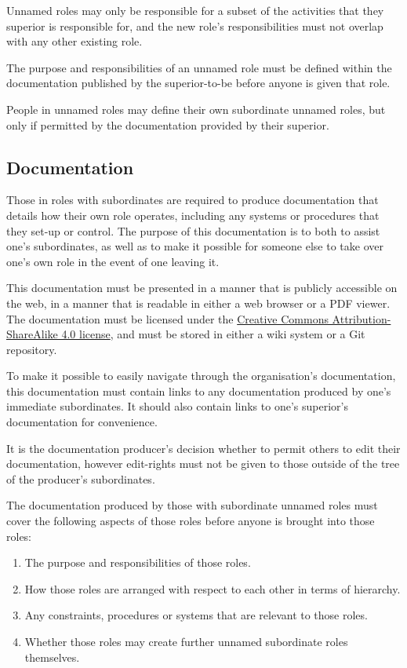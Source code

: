 Unnamed roles may only be responsible for a subset of the activities that they superior is responsible for, and the new role's responsibilities must not overlap with any other existing role.

The purpose and responsibilities of an unnamed role must be defined within the documentation published by the superior-to-be before anyone is given that role.

People in unnamed roles may define their own subordinate unnamed roles, but only if permitted by the documentation provided by their superior.

\subsection{Documentation}
\label{sec:documentation}

Those in roles with subordinates are required to produce documentation that details how their own role operates, including any systems or procedures that they set-up or control.  The purpose of this documentation is to both to assist one's subordinates, as well as to make it possible for someone else to take over one's own role in the event of one leaving it.

This documentation must be presented in a manner that is publicly accessible on the web, in a manner that is readable in either a web browser or a PDF viewer.  The documentation must be licensed under the \href{http://creativecommons.org/licenses/by-sa/4.0/}{Creative Commons Attribution-ShareAlike 4.0 license}, and must be stored in either a wiki system or a Git repository.

To make it possible to easily navigate through the organisation's documentation, this documentation must contain links to any documentation produced by one's immediate subordinates.  It should also contain links to one's superior's documentation for convenience.

It is the documentation producer's decision whether to permit others to edit their documentation, however edit-rights must not be given to those outside of the tree of the producer's subordinates.

The documentation produced by those with subordinate unnamed roles must cover the following aspects of those roles before anyone is brought into those roles:
\begin{enumerate}
\item The purpose and responsibilities of those roles.
\item How those roles are arranged with respect to each other in terms of hierarchy.
\item Any constraints, procedures or systems that are relevant to those roles.
\item Whether those roles may create further unnamed subordinate roles themselves.
\end{enumerate}

